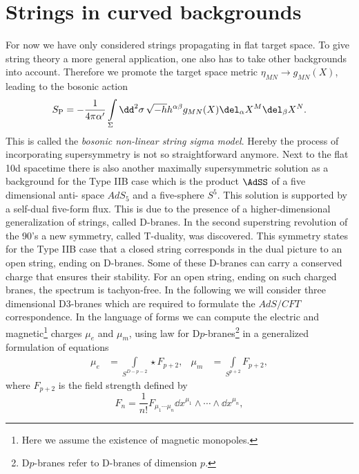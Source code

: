 \section{Strings in curved backgrounds}
For now we have only considered strings propagating in flat  target space. To give string theory a more general application, one also has to take other backgrounds into account. Therefore we promote the target space metric $\eta_{MN}\rightarrow g_{MN}(X)$, leading to the bosonic  action
%
%
\begin{equation}
S_{\rm P} = -\frac{1}{4\pi\alpha'}  \int\limits_{\Sigma} \dd^{2}\sigma\, \sqrt{-h}h^{\alpha\beta}g_{MN}(X) \del_{\alpha}X^{M}\del_{\beta}X^{N}.
\label{eq: S_P_nlsigma}
\end{equation}
%
%
This is called the \textit{bosonic non-linear string sigma model}. Hereby the process of incorporating supersymmetry is not so straightforward anymore. Next to the flat 10d  spacetime there is also another maximally supersymmetric solution as a background for the Type IIB case which is the product $\AdSS$ of a five dimensional anti- space $AdS_{5}$ and a five-sphere $S^{5}$. This solution is supported by a self-dual  five-form flux. This is due to the presence of a higher-dimensional generalization of strings, called D-branes. In the second superstring revolution of the 90's a new symmetry, called T-duality, was discovered. This symmetry states for the Type IIB case that a closed string corresponds in the dual picture to an open string, ending on D-branes. Some of these D-branes can carry a conserved charge that ensures their stability. For an open string, ending on such charged branes, the spectrum is tachyon-free. In the following we will consider three dimensional D3-branes which are required to formulate the $AdS/CFT$ correspondence. In the language of forms we can compute the electric and magnetic\footnote{Here we assume the existence of magnetic monopoles.} charges $\mu_{e}$ and $\mu_{m}$, using  law for D$p$-branes\footnote{D$p$-branes refer to D-branes of dimension $p$.} in a generalized formulation of  equations
%
%
\begin{align}
\mu_{e} &= \int\limits_{S^{D-p-2}} \star F_{p+2},  &   \mu_{m} &= \int\limits_{S^{p+2}}  F_{p+2},
\end{align}
%
%
where $F_{p+2}$ is the field strength defined by
%
%
\begin{equation}
F_{n} = \frac{1}{n!} F_{\mu_{1}\cdots \mu_{n}} \dd x^{\mu_{1}} \wedge \cdots \wedge \dd x^{\mu_{n}},
\end{equation}
